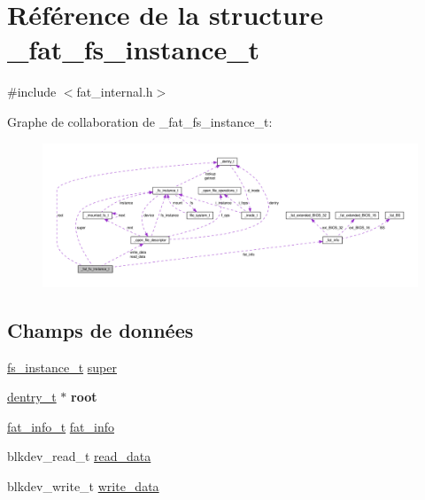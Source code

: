 \hypertarget{struct__fat__fs__instance__t}{\section{Référence de la structure \-\_\-fat\-\_\-fs\-\_\-instance\-\_\-t}
\label{struct__fat__fs__instance__t}
}


{\ttfamily \#include $<$fat\-\_\-internal.\-h$>$}



Graphe de collaboration de \-\_\-fat\-\_\-fs\-\_\-instance\-\_\-t\-:
\nopagebreak
\begin{figure}[H]
\begin{center}
\leavevmode
\includegraphics[width=350pt]{struct__fat__fs__instance__t__coll__graph}
\end{center}
\end{figure}
\subsection*{Champs de données}
\begin{DoxyCompactItemize}
\item 
\hyperlink{vfs_8h_a0eefa9aac35a5462ebf1e038992ca860}{fs\-\_\-instance\-\_\-t} \hyperlink{struct__fat__fs__instance__t_ac50318180f107a1950961c404ec6fd6d}{super}
\item 
\hypertarget{struct__fat__fs__instance__t_a209928b7f7db95270001a2eb47db4313}{\hyperlink{vfs_8h_ade5c998c6b3f09d2cf45d0e5ef8787da}{dentry\-\_\-t} $\ast$ {\bfseries root}}\label{struct__fat__fs__instance__t_a209928b7f7db95270001a2eb47db4313}

\item 
\hyperlink{fat__internal_8h_a1921d26ef987e5498294fe311a23c62f}{fat\-\_\-info\-\_\-t} \hyperlink{struct__fat__fs__instance__t_acebada58b620f950c9ef3c454db812fc}{fat\-\_\-info}
\item 
blkdev\-\_\-read\-\_\-t \hyperlink{struct__fat__fs__instance__t_adfdb319d2d87dc55a678366740a2bba9}{read\-\_\-data}
\item 
blkdev\-\_\-write\-\_\-t \hyperlink{struct__fat__fs__instance__t_a3056aeef9254049e772d6475510b0957}{write\-\_\-data}
\end{DoxyCompactItemize}


